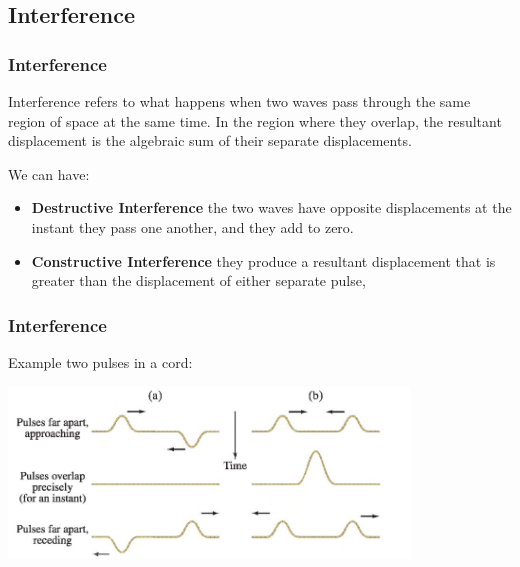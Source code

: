 \documentclass[]{beamer}
\begin{document}

\subsection{Interference}
\begin{frame}
\frametitle{Interference }




Interference refers to what happens when two waves pass through the same region
of space at the same time. In the region where they overlap, the resultant displacement is the algebraic sum of
their separate displacements.
\pause

\vspace{3mm}
We can have:

\pause
\begin{itemize}
\item \textbf{Destructive Interference} the two waves have opposite displacements at the instant they pass one another, and they
add to zero. 

\pause
\item \textbf{Constructive Interference} they produce a resultant displacement that is greater than the
displacement of either separate pulse,
\end{itemize}


  \end{frame}







\begin{frame}
\frametitle{Interference }

Example two pulses in a cord:




  \begin{center}
  \includegraphics[height=1.8in]{images4/15.jpg}
\end{center}





  \end{frame}
\end{document}
